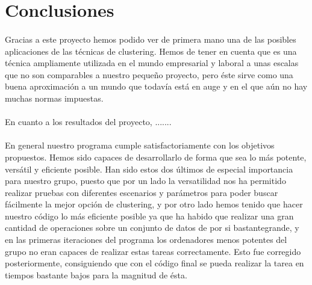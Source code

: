 \documentclass[10pt,a4paper]{article}
\begin{document}
\section{Conclusiones}
	\paragraph{}
	Gracias a este proyecto hemos podido ver de primera mano una de las posibles aplicaciones de las técnicas de clustering. Hemos de tener en cuenta que es una técnica ampliamente utilizada en el mundo empresarial y laboral a unas escalas que no son comparables a nuestro pequeño proyecto, pero éste sirve como una buena aproximación a un mundo que todavía está en auge y en el que aún no hay muchas normas impuestas. 
	\paragraph{}
	En cuanto a los resultados del proyecto, .......
	\paragraph{}
	En general nuestro programa cumple satisfactoriamente con los objetivos propuestos. Hemos sido capaces de desarrollarlo de forma que sea lo más potente, versátil y eficiente posible. Han sido estos dos últimos de especial importancia para nuestro grupo, puesto que por un lado la versatilidad nos ha permitido realizar pruebas con diferentes escenarios y parámetros para poder buscar fácilmente la mejor opción de clustering, y por otro lado hemos tenido que hacer nuestro código lo más eficiente posible ya que ha habido que realizar una gran cantidad de operaciones sobre un conjunto de datos de por si bastantegrande, y en las primeras iteraciones del programa los ordenadores menos potentes del grupo no eran capaces de realizar estas tareas correctamente. Esto fue corregido posteriormente, consiguiendo que con el código final se pueda realizar la tarea en tiempos bastante bajos para la magnitud de ésta.
\end{document}
